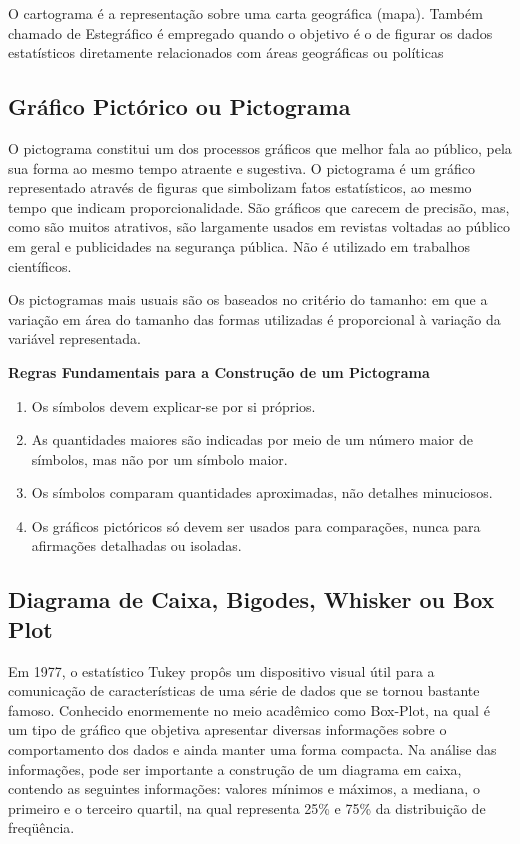 O cartograma é a representação sobre uma carta geográfica (mapa).
Também chamado de Estegráfico é empregado quando o objetivo é o de
figurar os dados estatísticos diretamente relacionados com áreas
geográficas ou políticas



\subsection{Gráfico Pictórico ou Pictograma}

O pictograma constitui um dos processos gráficos que melhor fala
ao público, pela sua forma ao mesmo tempo atraente e sugestiva. O
pictograma é um gráfico representado através de figuras que
simbolizam fatos estatísticos, ao mesmo tempo que indicam
proporcionalidade. São gráficos que carecem de precisão, mas, como
são muitos atrativos, são largamente usados em revistas voltadas
ao público em geral e publicidades na segurança pública. Não é
utilizado em trabalhos científicos.\vskip0.3cm

Os pictogramas mais usuais são os baseados no critério do tamanho: em que a variação em área do tamanho das formas utilizadas é proporcional à variação da variável representada.\vskip0.3cm



\textbf{Regras Fundamentais para a Construção de um Pictograma}

\begin{enumerate}
    \item Os símbolos devem explicar-se por si próprios.
    \item As quantidades maiores são indicadas por meio de um
    número maior de símbolos, mas não por um símbolo maior.
    \item Os símbolos comparam quantidades aproximadas, não
    detalhes minuciosos.
    \item Os gráficos pictóricos só devem ser usados para
    comparações, nunca para afirmações detalhadas ou isoladas.
\end{enumerate}


\subsection{Diagrama de Caixa, Bigodes, Whisker ou Box Plot}

\inic Em 1977, o estatístico Tukey propôs um dispositivo visual útil
para a comunicação de características de uma série de dados que se
tornou bastante famoso. Conhecido enormemente no meio acadêmico
como Box-Plot, na qual é um tipo de gráfico que objetiva
apresentar diversas informações sobre o comportamento dos dados e
ainda manter uma forma compacta. Na análise das informações, pode
ser importante a construção de um diagrama em caixa, contendo as
seguintes informações: valores mínimos e máximos, a mediana, o
primeiro e o terceiro quartil, na qual representa 25\% e 75\% da
distribuição de freqüência.\vskip0.3cm


